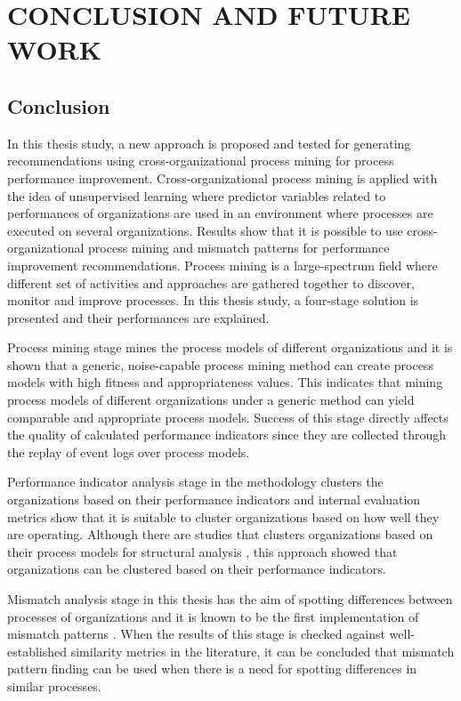 \chapter{CONCLUSION AND FUTURE WORK}
\label{chp:conclusion-and-future-work}

\section{Conclusion}

In this thesis study, a new approach is proposed and tested for generating recommendations using cross-organizational process mining for process performance improvement. Cross-organizational process mining is applied with the idea of unsupervised learning where predictor variables related to performances of organizations are used in an environment where processes are executed on several organizations. Results show that it is possible to use cross-organizational process mining and mismatch patterns for performance improvement recommendations. Process mining is a large-spectrum field where different set of activities and approaches are gathered together to discover, monitor and improve processes. In this thesis study, a four-stage solution is presented and their performances are explained.

Process mining stage mines the process models of different organizations and it is shown that a generic, noise-capable process mining method can create process models with high fitness and appropriateness values. This indicates that mining process models of different organizations under a generic method can yield comparable and appropriate process models. Success of this stage directly affects the quality of calculated performance indicators since they are collected through the replay of event logs over process models.

Performance indicator analysis stage in the methodology clusters the organizations based on their performance indicators and internal evaluation metrics show that it is suitable to cluster organizations based on how well they are operating. Although there are studies that clusters organizations based on their process models for structural analysis \cite{greco2005mining}, this approach showed that organizations can be clustered based on their performance indicators.

Mismatch analysis stage in this thesis has the aim of spotting differences between processes of organizations and it is known to be the first implementation of mismatch patterns \cite{dijkman2007mismatch}. When the results of this stage is checked against well-established similarity metrics in the literature, it can be concluded that mismatch pattern finding can be used when there is a need for spotting differences in similar processes. 

